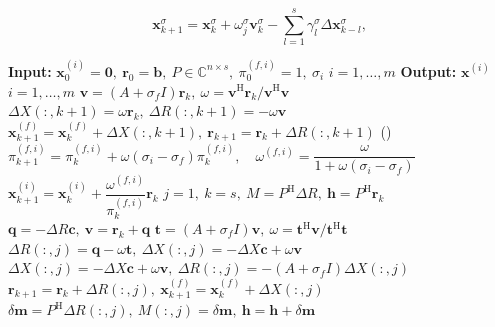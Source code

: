 \begin{equation}\label{eq:shifted-idr-main-solution}\bm x_{k+1}^{\sigma}=\bm x_k^{\sigma}+\omega_j^{\sigma}\bm v_k^{\sigma}-\sum_{l=1}^{s}\gamma_l^{\sigma}\Delta\bm x_{k-l}^{\sigma},\end{equation}
\begin{algorithm}[H]\caption{}\label{alg:shifted-idr}\begin{algorithmic}[1]
\Statex\textbf{Input:} $\bm x_0^{(i)}=\bm0,\ \bm r_0=\bm b,\ P\in\mathbb C^{n\times s},\ \pi_0^{(f,i)}=1,\ \sigma_i$  $i=1,\ldots,m$
\Statex\textbf{Output:} $\bm x^{(i)}$  $i=1,\ldots,m$
\State $\bm v=(A+\sigma_f I)\bm r_k,\ \omega=\bm v^{\mathrm H}\bm r_k/\bm v^{\mathrm H}\bm v$
\State $\Delta X(:,k+1)=\omega\bm r_k,\ \Delta R(:,k+1)=-\omega\bm v$
\State $\bm x_{k+1}^{(f)}=\bm x_k^{(f)}+\Delta X(:,k+1),\ \bm r_{k+1}=\bm r_k+\Delta R(:,k+1)$
\State ()
\State $\pi_{k+1}^{(f,i)}=\pi_k^{(f,i)}+\omega(\sigma_i-\sigma_f)\pi_k^{(f,i)},\quad\omega^{(f,i)}=\dfrac{\omega}{1+\omega(\sigma_i-\sigma_f)}$
\State $\bm x_{k+1}^{(i)}=\bm x_k^{(i)}+\dfrac{\omega^{(f,i)}}{\pi_k^{(f,i)}}\bm r_k$
\EndIf\EndFor\EndFor
\State $j=1,\ k=s,\ M=P^{\mathrm H}\Delta R,\ \bm h=P^{\mathrm H}\bm r_k$
\State {}
\State $\bm q=-\Delta R\bm c,\ \bm v=\bm r_k+\bm q$
\State $\bm t=(A+\sigma_f I)\bm v,\ \omega=\bm t^{\mathrm H}\bm v/\bm t^{\mathrm H}\bm t$
\State $\Delta R(:,j)=\bm q-\omega\bm t,\ \Delta X(:,j)=-\Delta X\bm c+\omega\bm v$
\Else
\State $\Delta X(:,j)=-\Delta X\bm c+\omega\bm v,\ \Delta R(:,j)=-(A+\sigma_f I)\Delta X(:,j)$
\EndIf
\State $\bm r_{k+1}=\bm r_k+\Delta R(:,j),\ \bm x_{k+1}^{(f)}=\bm x_k^{(f)}+\Delta X(:,j)$
\State $\delta\bm m=P^{\mathrm H}\Delta R(:,j),\ M(:,j)=\delta\bm m,\ \bm h=\bm h+\delta\bm m$
\end{algorithmic}\end{algorithm}
